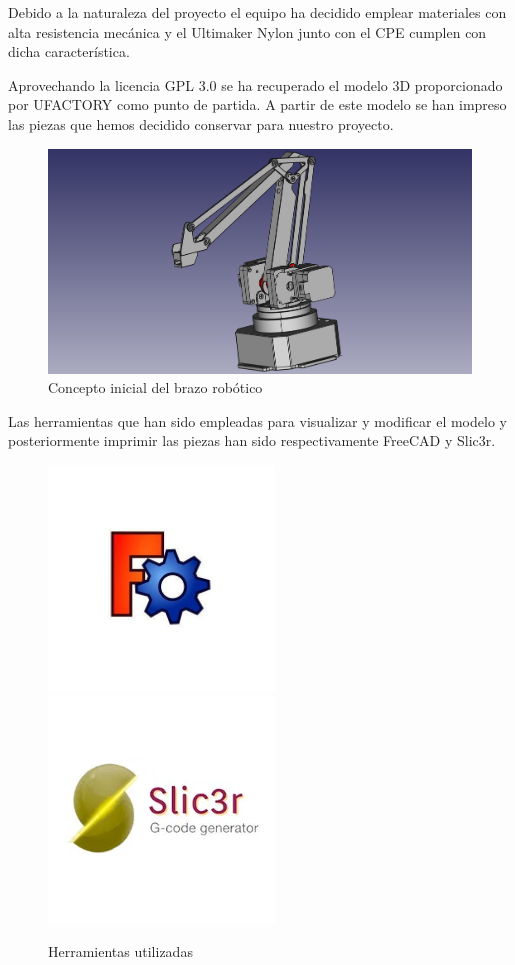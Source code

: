 Debido a la naturaleza del proyecto el equipo ha decidido emplear materiales con alta resistencia mecánica y el Ultimaker Nylon junto con el CPE cumplen con dicha característica.

Aprovechando la licencia GPL 3.0 se ha recuperado el modelo 3D proporcionado por UFACTORY como punto de partida. A partir de este modelo se han impreso las piezas que hemos decidido conservar para nuestro proyecto.

\begin{figure}[H]
    \centering
    \includegraphics[width=12cm]{pictures/brazo_vista_3d_inicial.png}
    \caption{Concepto inicial del brazo robótico}
    \label{fig:manipulador_inicial}
\end{figure}

Las herramientas que han sido empleadas para visualizar y modificar el modelo y posteriormente imprimir las piezas han sido respectivamente FreeCAD y Slic3r.

\begin{figure}[H]
    \centering
    \includegraphics[width=6cm]{pictures/freeCAD.jpg}
    \includegraphics[width=6cm]{pictures/slic3r_logo.jpg}
    \caption{Herramientas utilizadas}
    \label{fig:herramientas_3d}
\end{figure}

